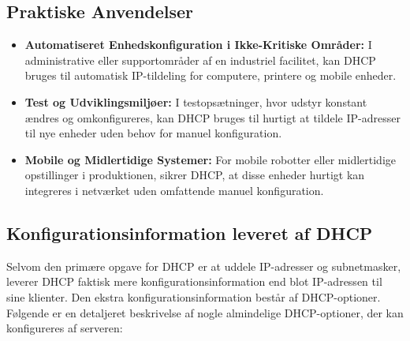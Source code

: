 \subsection{Praktiske Anvendelser}
\begin{itemize}
	\item \textbf{Automatiseret Enhedskonfiguration i Ikke-Kritiske Områder:} I administrative eller supportområder af en industriel facilitet, kan DHCP bruges til automatisk IP-tildeling for computere, printere og mobile enheder.
	\item \textbf{Test og Udviklingsmiljøer:} I testopsætninger, hvor udstyr konstant ændres og omkonfigureres, kan DHCP bruges til hurtigt at tildele IP-adresser til nye enheder uden behov for manuel konfiguration.
	\item \textbf{Mobile og Midlertidige Systemer:} For mobile robotter eller midlertidige opstillinger i produktionen, sikrer DHCP, at disse enheder hurtigt kan integreres i netværket uden omfattende manuel konfiguration.
\end{itemize}

\subsection{Konfigurationsinformation leveret af DHCP}
Selvom den primære opgave for DHCP er at uddele IP-adresser og subnetmasker, leverer DHCP faktisk mere konfigurationsinformation end blot IP-adressen til sine klienter. Den ekstra konfigurationsinformation består af DHCP-optioner. Følgende er en detaljeret beskrivelse af nogle almindelige DHCP-optioner, der kan konfigureres af serveren:

